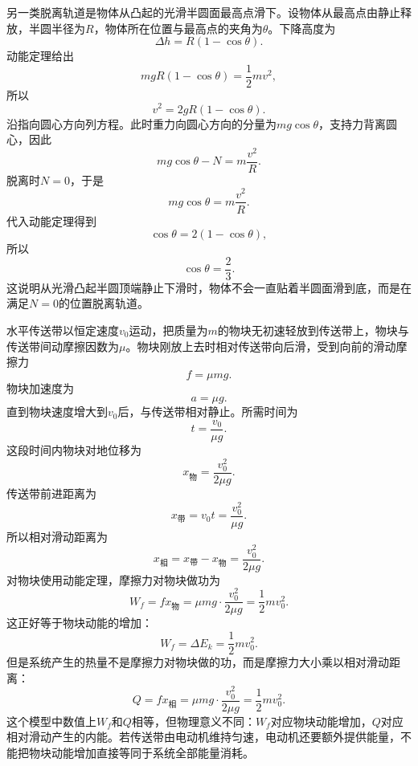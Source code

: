 \begin{casetypebox}[title={\strut\textcolor{white}{\bfseries 常见题型：凸起半圆面上的脱离}}]
  另一类脱离轨道是物体从凸起的光滑半圆面最高点滑下。设物体从最高点由静止释放，半圆半径为$R$，物体所在位置与最高点的夹角为$\theta$。下降高度为
  \[
    \Delta h=R(1-\cos\theta).
  \]
  动能定理给出
  \[
    mgR(1-\cos\theta)=\frac12mv^2,
  \]
  所以
  \[
    v^2=2gR(1-\cos\theta).
  \]
  沿指向圆心方向列方程。此时重力向圆心方向的分量为$mg\cos\theta$，支持力背离圆心，因此
  \[
    mg\cos\theta-N=m\frac{v^2}{R}.
  \]
  脱离时$N=0$，于是
  \[
    mg\cos\theta=m\frac{v^2}{R}.
  \]
  代入动能定理得到
  \[
    \cos\theta=2(1-\cos\theta),
  \]
  所以
  \[
    \cos\theta=\frac23.
  \]
  这说明从光滑凸起半圆顶端静止下滑时，物体不会一直贴着半圆面滑到底，而是在满足$N=0$的位置脱离轨道。
\end{casetypebox}

\begin{casetypebox}[title={\strut\textcolor{white}{\bfseries 常见题型：传送带中的动能定理}}]
  水平传送带以恒定速度$v_0$运动，把质量为$m$的物块无初速轻放到传送带上，物块与传送带间动摩擦因数为$\mu$。物块刚放上去时相对传送带向后滑，受到向前的滑动摩擦力
  \[
    f=\mu mg.
  \]
  物块加速度为
  \[
    a=\mu g.
  \]
  直到物块速度增大到$v_0$后，与传送带相对静止。所需时间为
  \[
    t=\frac{v_0}{\mu g}.
  \]
  这段时间内物块对地位移为
  \[
    x_{\text{物}}=\frac{v_0^2}{2\mu g}.
  \]
  传送带前进距离为
  \[
    x_{\text{带}}=v_0t=\frac{v_0^2}{\mu g}.
  \]
  所以相对滑动距离为
  \[
    x_{\text{相}}=x_{\text{带}}-x_{\text{物}}
    =\frac{v_0^2}{2\mu g}.
  \]
  对物块使用动能定理，摩擦力对物块做功为
  \[
    W_f=fx_{\text{物}}
    =\mu mg\cdot\frac{v_0^2}{2\mu g}
    =\frac12mv_0^2.
  \]
  这正好等于物块动能的增加：
  \[
    W_f=\Delta E_k=\frac12mv_0^2.
  \]
  但是系统产生的热量不是摩擦力对物块做的功，而是摩擦力大小乘以相对滑动距离：
  \[
    Q=fx_{\text{相}}
    =\mu mg\cdot\frac{v_0^2}{2\mu g}
    =\frac12mv_0^2.
  \]
  这个模型中数值上$W_f$和$Q$相等，但物理意义不同：$W_f$对应物块动能增加，$Q$对应相对滑动产生的内能。若传送带由电动机维持匀速，电动机还要额外提供能量，不能把物块动能增加直接等同于系统全部能量消耗。
\end{casetypebox}

